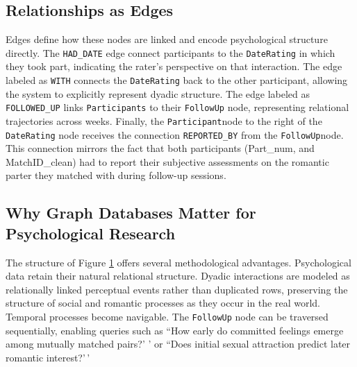 \documentclass[sn-apa,pdflatex]{sn-jnl}
\theoremstyle{remark}
\theoremstyle{definition}
\begin{document}
\subsection{Relationships as Edges}\label{relationships-as-edges}

Edges define how these nodes are linked and encode psychological
structure directly. The \texttt{HAD\_DATE} edge connect participants to
the \texttt{DateRating} in which they took part, indicating the rater's
perspective on that interaction. The edge labeled as \texttt{WITH}
connects the \texttt{DateRating} back to the other participant, allowing
the system to explicitly represent dyadic structure. The edge labeled as
\texttt{FOLLOWED\_UP} links \texttt{Participants} to their
\texttt{FollowUp} node, representing relational trajectories across
weeks. Finally, the \texttt{Participant}node to the right of the
\texttt{DateRating} node receives the connection \texttt{REPORTED\_BY}
from the \texttt{FollowUp}node. This connection mirrors the fact that
both participants (Part\_num, and MatchID\_clean) had to report their
subjective assessments on the romantic parter they matched with during
follow-up sessions.

\subsection{Why Graph Databases Matter for Psychological
Research}\label{why-graph-databases-matter-for-psychological-research}

The structure of Figure \hyperref[fig:F2]{1} offers several
methodological advantages. Psychological data retain their natural
relational structure. Dyadic interactions are modeled as relationally
linked perceptual events rather than duplicated rows, preserving the
structure of social and romantic processes as they occur in the real
world. Temporal processes become navigable. The \texttt{FollowUp} node
can be traversed sequentially, enabling queries such as ``How early do
committed feelings emerge among mutually matched pairs?' ' or ``Does
initial sexual attraction predict later romantic interest?'\,'
\end{document}
